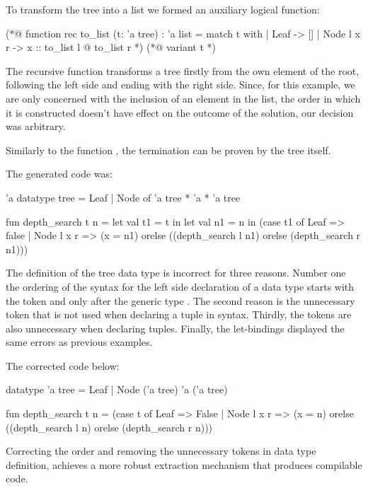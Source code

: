 To transform the tree into a list we formed an auxiliary logical function:

\begin{gospell}
(*@ function rec to_list (t: 'a tree) : 'a list = 
  match t with
  | Leaf -> []
  | Node l x r -> x :: to_list l @ to_list r
*)
(*@
  variant t
*)
\end{gospell}

The recursive function  transforms a tree firstly from the own element of the root, following the left side and 
ending with the right side. Since, for this example, we are only concerned with the inclusion of an element in the list, the order 
in which it is constructed doesn't have effect on the outcome of the solution, our decision was arbitrary.

Similarly to the function , the termination can be proven by the tree itself.

The generated \cml code was:

\begin{cakeml}
'a datatype tree = Leaf | Node of 'a tree * 'a * 'a tree

fun depth_search t n = let val t1 = t in
  let val n1 = n in
  (case t1 of
    Leaf => false
  | Node l x r =>
    (x = n1) orelse ((depth_search l n1) orelse (depth_search r n1)))
\end{cakeml}

The definition of the tree data type is incorrect for three reasons. Number one the ordering of the syntax for the left side declaration 
of a data type starts with the token  and only after the generic type . The second reason is the
unnecessary token  that is not used when declaring a tuple in \cml syntax. Thirdly, the tokens \inlinecode{*} are also
unnecessary when declaring tuples. Finally, the let-bindings displayed the same errors as previous examples.

The corrected code below:

\begin{cakeml}
datatype 'a tree = Leaf | Node ('a tree) 'a ('a tree)

fun depth_search t n =
  (case t of
    Leaf => False
  | Node l x r =>
    (x = n) orelse ((depth_search l n) orelse (depth_search r n)))
\end{cakeml}

Correcting the order and removing the unnecessary tokens in data type definition, achieves a more robust extraction mechanism that 
produces compilable \cml code.

